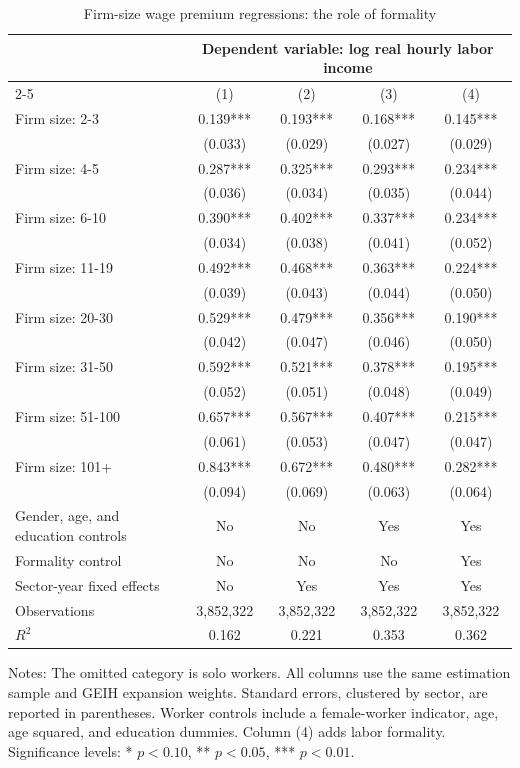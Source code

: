 \begin{table}[htbp]
  \centering
  \caption{Firm-size wage premium regressions: the role of formality}
  \label{tab:firm-size-wage-premium-regressions}
  \small
  \begin{tabular}{lcccc}
    \toprule
    & \multicolumn{4}{c}{Dependent variable: log real hourly labor income} \\
    \cmidrule(lr){2-5}
    & (1) & (2) & (3) & (4) \\
    \midrule
    Firm size: 2-3 & 0.139*** & 0.193*** & 0.168*** & 0.145*** \\
     & (0.033) & (0.029) & (0.027) & (0.029) \\
    Firm size: 4-5 & 0.287*** & 0.325*** & 0.293*** & 0.234*** \\
     & (0.036) & (0.034) & (0.035) & (0.044) \\
    Firm size: 6-10 & 0.390*** & 0.402*** & 0.337*** & 0.234*** \\
     & (0.034) & (0.038) & (0.041) & (0.052) \\
    Firm size: 11-19 & 0.492*** & 0.468*** & 0.363*** & 0.224*** \\
     & (0.039) & (0.043) & (0.044) & (0.050) \\
    Firm size: 20-30 & 0.529*** & 0.479*** & 0.356*** & 0.190*** \\
     & (0.042) & (0.047) & (0.046) & (0.050) \\
    Firm size: 31-50 & 0.592*** & 0.521*** & 0.378*** & 0.195*** \\
     & (0.052) & (0.051) & (0.048) & (0.049) \\
    Firm size: 51-100 & 0.657*** & 0.567*** & 0.407*** & 0.215*** \\
     & (0.061) & (0.053) & (0.047) & (0.047) \\
    Firm size: 101+ & 0.843*** & 0.672*** & 0.480*** & 0.282*** \\
     & (0.094) & (0.069) & (0.063) & (0.064) \\
    \midrule
    Gender, age, and education controls & No & No & Yes & Yes \\
    Formality control & No & No & No & Yes \\
    Sector-year fixed effects & No & Yes & Yes & Yes \\
    Observations & 3,852,322 & 3,852,322 & 3,852,322 & 3,852,322 \\
    $R^2$ & 0.162 & 0.221 & 0.353 & 0.362 \\
    \bottomrule
  \end{tabular}
  \vspace{0.3em}
  \begin{minipage}{0.95\textwidth}
  \footnotesize
  Notes: The omitted category is solo workers. All columns use the same estimation sample and GEIH expansion weights. Standard errors, clustered by sector, are reported in parentheses. Worker controls include a female-worker indicator, age, age squared, and education dummies. Column (4) adds labor formality. Significance levels: * $p<0.10$, ** $p<0.05$, *** $p<0.01$.
  \end{minipage}
\end{table}
